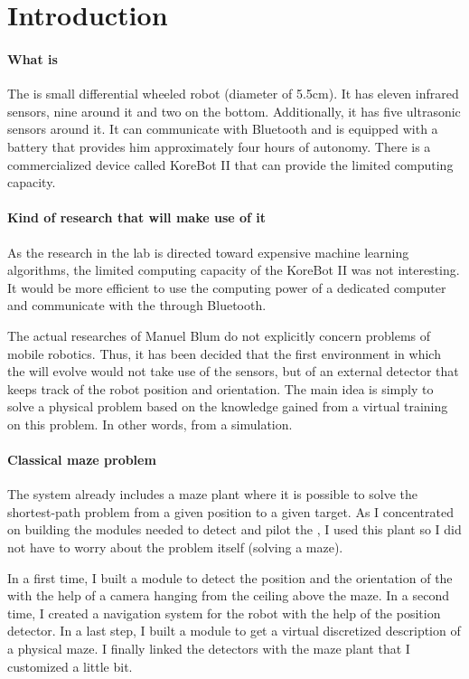 \chapter{Introduction}

\subsubsection{What is \khepera{}}
The \khepera{} is small differential wheeled robot (diameter of 5.5cm). 
It has eleven infrared sensors, nine around it and two on the bottom. 
Additionally, it has five ultrasonic sensors around it. It can communicate 
with Bluetooth and is equipped with a battery that provides him 
approximately four hours of autonomy. There is a commercialized device 
called KoreBot II that can provide the \khepera{} limited computing 
capacity. 

\subsubsection{Kind of research that will make use of it}
As the research in the lab is directed toward expensive machine learning 
algorithms, the limited computing capacity of the KoreBot II was not 
interesting. It would be more efficient to use the computing power of 
a dedicated computer and communicate with the \khepera{} through 
Bluetooth.

The actual researches of Manuel Blum do not explicitly concern problems 
of mobile robotics. Thus, it has been decided that the first environment 
in which the \khepera{} will evolve would not take use of the sensors, 
but of an external detector that keeps track of the robot position and 
orientation. The main idea is simply to solve a physical problem based 
on the knowledge gained from a virtual training on this problem. In 
other words, from a simulation.

\subsubsection{Classical maze problem}
The \clsquare{} system already includes a maze plant where it is possible 
to solve the shortest-path problem from a given position to a given 
target. As I concentrated on building the modules needed to detect and 
pilot the \khepera{}, I used this plant so I did not have to worry 
about the problem itself (solving a maze).

In a first time, I built a module to detect the position and the 
orientation of the \khepera{} with the help of a camera hanging from 
the ceiling above the maze. In a second time, I created a navigation 
system for the robot with the help of the position detector. In a 
last step, I built a module to get a virtual discretized description 
of a physical maze. I finally linked the detectors with the maze plant 
that I customized a little bit.

